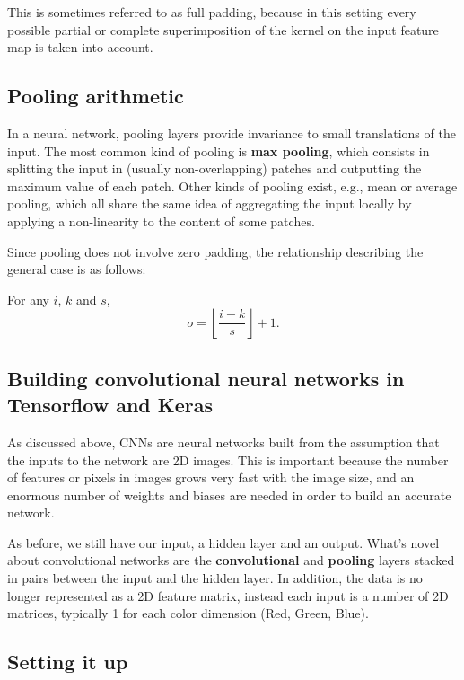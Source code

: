 \documentclass[%
oneside,                 %
final,                   %
10pt]{article}
\begin{document}
This is sometimes referred to as full padding, because in this
setting every possible partial or complete superimposition of the kernel on the
input feature map is taken into account. 

\subsection*{Pooling arithmetic}

In a neural network, pooling layers provide invariance to small translations of
the input. The most common kind of pooling is \textbf{max pooling}, which
consists in splitting the input in (usually non-overlapping) patches and
outputting the maximum value of each patch. Other kinds of pooling exist, e.g.,
mean or average pooling, which all share the same idea of aggregating the input
locally by applying a non-linearity to the content of some patches.

Since pooling does not involve
zero padding, the relationship describing the general case is as follows:

For any $i$, $k$ and $s$,
\begin{equation*}
    o = \left\lfloor \frac{i - k}{s} \right\rfloor + 1.
\end{equation*}

\subsection*{Building convolutional neural networks in Tensorflow and Keras}

As discussed above, CNNs are neural networks built from the assumption that the inputs
to the network are 2D images. This is important because the number of features or pixels in images
grows very fast with the image size, and an enormous number of weights and biases are needed in order to build an accurate network.  

As before, we still have our input, a hidden layer and an output. What's novel about convolutional networks
are the \textbf{convolutional} and \textbf{pooling} layers stacked in pairs between the input and the hidden layer.
In addition, the data is no longer represented as a 2D feature matrix, instead each input is a number of 2D
matrices, typically 1 for each color dimension (Red, Green, Blue). 

\subsection*{Setting it up}
\end{document}
